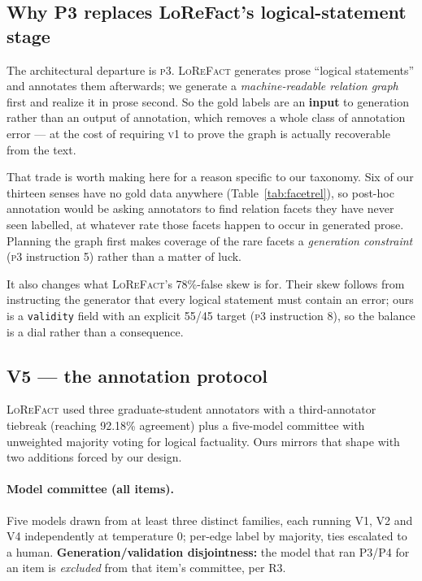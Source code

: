 \documentclass[11pt]{article}
\begin{document}
\clearpage

\subsection{Why P3 replaces LoReFact's logical-statement stage}
\label{sec:p3rationale}

The architectural departure is \textsc{p3}. \textsc{LoReFact} generates prose ``logical
statements'' and annotates them afterwards; we generate a \emph{machine-readable relation
graph} first and realize it in prose second. So the gold labels are an \textbf{input} to
generation rather than an output of annotation, which removes a whole class of annotation
error --- at the cost of requiring \textsc{v1} to prove the graph is actually recoverable from
the text.

That trade is worth making here for a reason specific to our taxonomy. Six of our thirteen
senses have no gold data anywhere (Table~\ref{tab:facetrel}), so post-hoc annotation would be
asking annotators to find relation facets they have never seen labelled, at whatever rate those
facets happen to occur in generated prose. Planning the graph first makes coverage of the
rare facets a \emph{generation constraint} (\textsc{p3} instruction 5) rather than a matter
of luck.

It also changes what \textsc{LoReFact}'s 78\%-false skew is for. Their skew follows from
instructing the generator that every logical statement must contain an error; ours is a
\texttt{validity} field with an explicit 55/45 target (\textsc{p3} instruction 8), so the
balance is a dial rather than a consequence.

\subsection{V5 --- the annotation protocol}
\label{sec:agreement}

\textsc{LoReFact} used three graduate-student annotators with a third-annotator tiebreak
(reaching 92.18\% agreement) plus a five-model committee with unweighted majority voting for
logical factuality. Ours mirrors that shape with two additions forced by our design.

\paragraph{Model committee (all items).} Five models drawn from at least three distinct
families, each running V1, V2 and V4 independently at temperature 0; per-edge label by
majority, ties escalated to a human. \textbf{Generation/validation disjointness:} the model
that ran P3/P4 for an item is \emph{excluded} from that item's committee, per R3.
\end{document}
